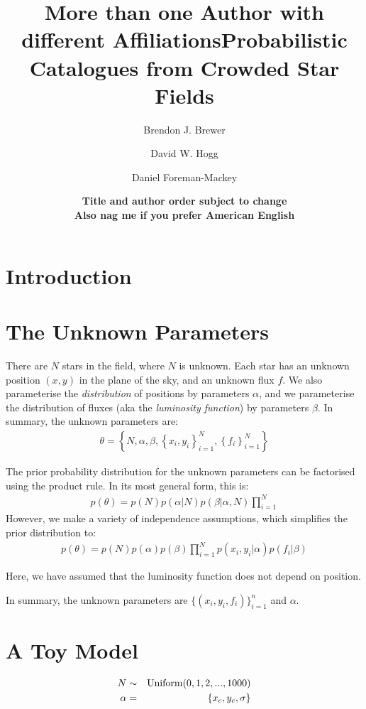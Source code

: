 \documentclass[letterpaper, 11pt]{article}
\title{More than one Author with different Affiliations}
\title{Probabilistic Catalogues from Crowded Star Fields}
\author[1,2]{Brendon J. Brewer}
\author[3]{David W. Hogg}
\author[3]{Daniel Foreman-Mackey}
\affil[1]{UCSB}
\affil[2]{Auckland}
\affil[3]{NYU}
\date{{\bf Title and author order subject to change} \\
{\bf Also nag me if you prefer American English}}
\begin{document}
\maketitle

\section{Introduction}

\section{The Unknown Parameters}
There are $N$ stars in the field, where $N$ is unknown. Each star has an unknown
position $(x,y)$ in the plane of the sky, and an unknown flux $f$. We also
parameterise the {\it distribution} of positions by parameters $\alpha$,
and we parameterise the distribution of fluxes (aka the {\it luminosity
function}) by parameters $\beta$. In summary, the unknown parameters are:
\begin{eqnarray}
\theta = \left\{N, \alpha, \beta, \left\{x_i, y_i\right\}_{i=1}^N, 
\left\{f_i\right\}_{i=1}^N\right\}
\end{eqnarray}

The prior probability distribution for the unknown parameters can be factorised
using the product rule. In its most general form, this is:
\begin{eqnarray}
p(\theta) = p(N)p(\alpha|N)p(\beta|\alpha,N)\prod_{i=1}^N 
\end{eqnarray}
However, we make a variety of independence assumptions, which simplifies the
prior
distribution to:
\begin{eqnarray}
p(\theta) = p(N)p(\alpha)p(\beta)\prod_{i=1}^N p(x_i, y_i | \alpha)
p(f_i | \beta) 
\end{eqnarray}

Here, we have assumed that the luminosity function does not depend on position.

In summary, the unknown parameters are $\{(x_i, y_i, f_i)\}_{i=1}^n$
and $\alpha$.

\section{A Toy Model}

\begin{eqnarray}
N &\sim& \textnormal{Uniform}(0, 1, 2, ..., 1000) \\
\alpha &=& \left\{x_c, y_c, \sigma\right\} \\
\end{eqnarray}
\end{document}
